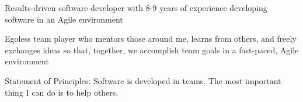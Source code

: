 %
    \begin{itemize*}
        \item Results-driven software developer with 8-9 years of experience developing software in an Agile environment
        \item Egoless team player who mentors those around me, learns from others, and freely exchanges ideas so that,
            together, we accomplish team goals in a fast-paced, Agile environment
        \item Statement of Principles: Software is developed in teams.  The most important thing I can do is to help others.
    \end{itemize*}
